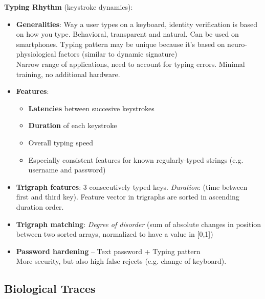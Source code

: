 \documentclass[a4paper]{article}
\begin{document}
      \textbf{Typing Rhythm} (keystroke dynamics):
      \begin{itemize}
        \item \textbf{Generalities}: Way a user types on a keyboard, identity verification is based on how you type. Behavioral, transparent and natural. Can be used on smartphones. Typing pattern may be unique because it's based on neuro-physiological factors (similar to dynamic signature)\\
        Narrow range of applications, need to account for typing errors. Minimal training, no additional hardware.
        \item \textbf{Features}:
        \begin{itemize}
          \item \textbf{Latencies} between succesive keystrokes
          \item \textbf{Duration} of each keystroke
          \item Overall typing speed
          \item Especially consistent features for known regularly-typed strings (e.g. username and password)
        \end{itemize}
        \item \textbf{Trigraph features}: 3 consecutively typed keys. \emph{Duration}: (time between first and third key). Feature vector in trigraphs are sorted in ascending duration order.
        \item \textbf{Trigraph matching}: \emph{Degree of disorder} (sum of absolute changes in position between two sorted arrays, normalized to have a value in [0,1])
        \item\textbf{Password hardening} -- Text password + Typing pattern\\
        More security, but also high false rejects (e.g. change of keyboard).
      \end{itemize}
  \subsection*{Biological Traces}
\end{document}
